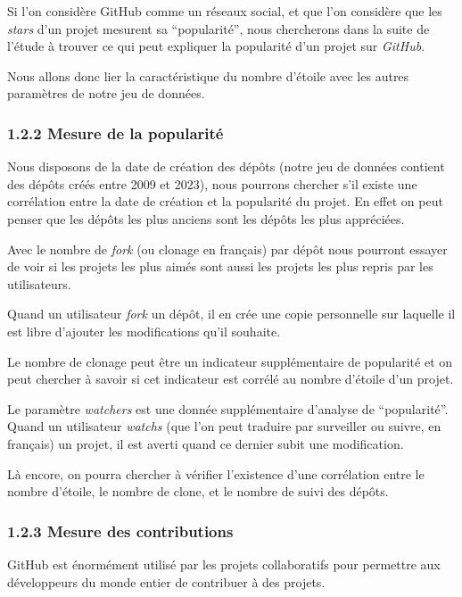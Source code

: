 \documentclass[
]{article}
\begin{document}
Si l'on considère GitHub comme un réseaux social, et que l'on considère
que les \emph{stars} d'un projet mesurent sa ``popularité'', nous
chercherons dans la suite de l'étude à trouver ce qui peut expliquer la
popularité d'un projet sur \emph{GitHub}.

Nous allons donc lier la caractéristique du nombre d'étoile avec les
autres paramètres de notre jeu de données.

\subsubsection{1.2.2 Mesure de la
popularité}\label{mesure-de-la-popularituxe9}

Nous disposons de la date de création des dépôts (notre jeu de données
contient des dépôts créés entre 2009 et 2023), nous pourrons chercher
s'il existe une corrélation entre la date de création et la popularité
du projet. En effet on peut penser que les dépôts les plus anciens sont
les dépôts les plus appréciées.

Avec le nombre de \emph{fork} (ou clonage en français) par dépôt nous
pourront essayer de voir si les projets les plus aimés sont aussi les
projets les plus repris par les utilisateurs.

Quand un utilisateur \emph{fork} un dépôt, il en crée une copie
personnelle sur laquelle il est libre d'ajouter les modifications qu'il
souhaite.

Le nombre de clonage peut être un indicateur supplémentaire de
popularité et on peut chercher à savoir si cet indicateur est corrélé au
nombre d'étoile d'un projet.

Le paramètre \emph{watchers} est une donnée supplémentaire d'analyse de
``popularité''. Quand un utilisateur \emph{watchs} (que l'on peut
traduire par surveiller ou suivre, en français) un projet, il est averti
quand ce dernier subit une modification.

Là encore, on pourra chercher à vérifier l'existence d'une corrélation
entre le nombre d'étoile, le nombre de clone, et le nombre de suivi des
dépôts.

\subsubsection{1.2.3 Mesure des
contributions}\label{mesure-des-contributions}

GitHub est énormément utilisé par les projets collaboratifs pour
permettre aux développeurs du monde entier de contribuer à des projets.
\end{document}
